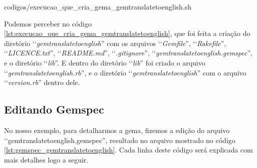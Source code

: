 %



{codigos/execucao_que_cria_gema_gemtranslatetoenglish.sh}

Podemos perceber no código \ref{lst:execucao_que_cria_gema_gemtranslatetoenglish}, que foi feita a criação do
diretório ‘‘\emph{gemtranslatetoenglish}'' com os arquivos ‘‘\emph{Gemfile}'', ‘‘\emph{Rakefile}'',
‘‘\emph{LICENCE.txt}'', ‘‘\emph{README.md}'', ‘‘\emph{.gitignore}'', ‘‘\emph{gemtranslatetoenglish.gemspec}'',
e o diretório ‘‘\emph{lib}''. E dentro do diretório ‘‘\emph{lib}'' foi criado o arquivo
‘‘\emph{gemtranslatetoenglish.rb}'', e o diretório ‘‘\emph{gemtranslatetoenglish}'' com o arquivo
‘‘\emph{version.rb}'' dentro dele.

\subsection{Editando Gemspec}
\label{subsection:editando_gemspec}


No nosso exemplo, para detalharmos a gema, fizemos a edição do arquivo ‘‘gemtranslatetoenglish.gemspec'',
resultado no arquivo mostrado no código \ref{lst:gemspec_gemtranslatetoenglish}.
Cada linha deste código será explicada com mais detalhes logo a seguir.

